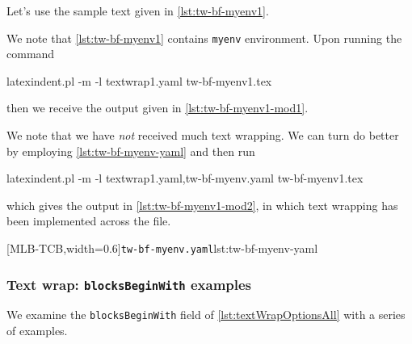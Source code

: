  \begin{example}
 Let's use the sample text given in \cref{lst:tw-bf-myenv1}.  


 We note that \cref{lst:tw-bf-myenv1} contains \texttt{myenv} environment. Upon running
 the command

 \begin{commandshell}
latexindent.pl -m -l textwrap1.yaml tw-bf-myenv1.tex
\end{commandshell}

 then we receive the output given in \cref{lst:tw-bf-myenv1-mod1}.


 We note that we have \emph{not} received much text wrapping. We can turn do better by
 employing \cref{lst:tw-bf-myenv-yaml} and then run

 \begin{commandshell}
latexindent.pl -m -l textwrap1.yaml,tw-bf-myenv.yaml tw-bf-myenv1.tex
\end{commandshell}

 which gives the output in \cref{lst:tw-bf-myenv1-mod2}, in which text wrapping has been
 implemented across the file.
 \begin{cmhtcbraster}[raster column skip=.01\linewidth,
   raster left skip=-1.5cm,
   raster force size=false,
   raster column 1/.style={add to width=-.1\textwidth},
   raster column 2/.style={add to width=.1\textwidth},
  ]
  [MLB-TCB,width=0.6\linewidth]{\texttt{tw-bf-myenv.yaml}}{lst:tw-bf-myenv-yaml}
 \end{cmhtcbraster}

 \end{example}

\subsubsection{Text wrap: \texttt{blocksBeginWith} examples}
 We examine the \texttt{blocksBeginWith} field of \cref{lst:textWrapOptionsAll} with a
 series of examples. 

